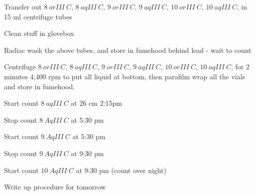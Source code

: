\documentclass[idxtotoc,hyperref,openany,oneside]{labbook} %
\newcommand{\cmark}{\ding{51}}%
\newcommand{\done}{\rlap{$\square$}{\raisebox{2pt}{\large\hspace{1pt}\cmark}}%
  \hspace{-2.5pt}}
\begin{document}
\begin{todolist}
\item[\done]{Transfer out $\boxed{8\ orIII\ C}$, $\boxed{8\ aqIII\ C}$,
  $\boxed{9\ orIII\ C}$, $\boxed{9\ aqIII\ C}$, $\boxed{10\ orIII\ C}$,
  $\boxed{10\ aqIII\ C}$, in 15 ml centrifuge tubes}
\item[\done]{Clean stuff in glovebox}
\item[\done]{Radiac wash the above tubes, and store in fumehood behind
  lead - wait to count}
\item[\done]{Centrifuge $\boxed{8\ orIII\ C}$, $\boxed{8\ aqIII\ C}$,
  $\boxed{9\ orIII\ C}$, $\boxed{9\ aqIII\ C}$, $\boxed{10\ orIII\ C}$,
  $\boxed{10\ aqIII\ C}$, for 2 minutes 4,400 rpm to put all liquid at
  bottom, then parafilm wrap all the vials and store in fumehood.}
\item[\done]{Start count $\boxed{8\ aqIII\ C}$ at 26 cm 2:15pm}
\item[\done]{Stop count $\boxed{8\ AqIII\ C}$ at 5:30 pm}
\item[\done]{Start count $\boxed{9\ AqIII\ C}$ at 5:30 pm}
\item[\done]{Stop count $\boxed{9\ AqIII\ C}$ at 9:30 pm}
\item[\done]{Start count $\boxed{10\ AqIII\ C}$
  at 9:30 pm (count over night)}
\item[\done]{Write up procedure for tomorrow}

\end{todolist}
\end{document}
